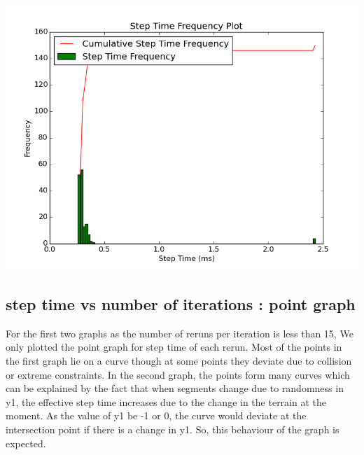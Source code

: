 \documentclass[11pt]{article}
\begin{document}
	\begin{center}
	  \includegraphics[scale=0.5]{images/g26_plot03_1200x150_uneven}
	\end{center}
	
	\subsection{step time vs number of iterations : point graph}
	For the first two graphs as the number of reruns per iteration is less than 15, We only plotted the point graph for step time of each rerun. Most of 
	the points in the first graph lie on a curve though at some points they deviate due to collision or extreme constraints. In the second graph, the points 
	form many curves  which can be explained by the fact that when segments change due to randomness in y1, the effective step time increases due to the 
	change in the terrain at the moment. As the value of y1 be -1 or 0, the curve would deviate at the intersection point if there is a change in y1. So, this 
	behaviour of the graph is expected.
	
\end{document}
